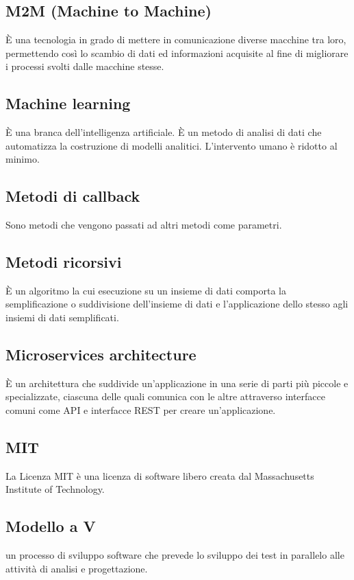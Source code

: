\section{}

\subsection*{M2M (Machine to Machine)} È una tecnologia in grado di mettere in comunicazione diverse macchine tra loro, permettendo così lo scambio di dati ed informazioni acquisite al fine di migliorare i processi svolti dalle macchine stesse.

\subsection*{Machine learning} È una branca dell'intelligenza artificiale. È un metodo di analisi di dati che automatizza la costruzione di modelli analitici. L'intervento umano è ridotto al minimo.

\subsection*{Metodi di callback} Sono metodi che vengono passati ad altri metodi come parametri.

\subsection*{Metodi ricorsivi} È un algoritmo la cui esecuzione su un insieme di dati comporta la semplificazione o suddivisione dell'insieme di dati e l'applicazione dello stesso agli insiemi di dati semplificati.

\subsection*{Microservices architecture} È un architettura che suddivide un’applicazione in una serie di parti più piccole e specializzate, ciascuna delle quali comunica con le altre attraverso interfacce comuni come API e interfacce REST per creare un’applicazione.

\subsection*{MIT} La Licenza MIT è una licenza di software libero creata dal Massachusetts Institute of Technology.

\subsection*{Modello a V} un processo di sviluppo software che prevede lo sviluppo dei test in parallelo alle attività di analisi e progettazione.

